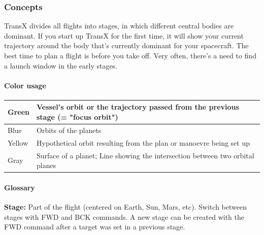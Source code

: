 \documentclass[Orbiter User Manual.tex]{subfiles}
\begin{document}
\subsubsection{Concepts}
TransX divides all flights into stages, in which different central bodies are
dominant. If you start up TransX for the first time, it will show your current
trajectory around the body that's currently dominant for your spacecraft. The
best time to plan a flight is before you take off. Very often, there's a need to
find a launch window in the early stages.

\paragraph{Color usage}
	\begin{longtable}{ p{} p{} }
	\hline
	Green & Vessel's orbit or the trajectory passed from the previous stage (=
		"focus orbit")\\
	\hline
	Blue & Orbits of the planets\\
	\hline
	Yellow & Hypothetical orbit resulting from the plan or manoevre being set
		up\\
	\hline
	Gray & Surface of a planet; Line showing the intersection between two
		orbital planes\\
	\hline
	\end{longtable}

\paragraph{Glossary}
\textbf{Stage:} Part of the flight (centered on Earth, Sun, Mars, etc). Switch
between stages with FWD and BCK commands. A new stage can be created with the
FWD command after a target was set in a previous stage.
\end{document}

